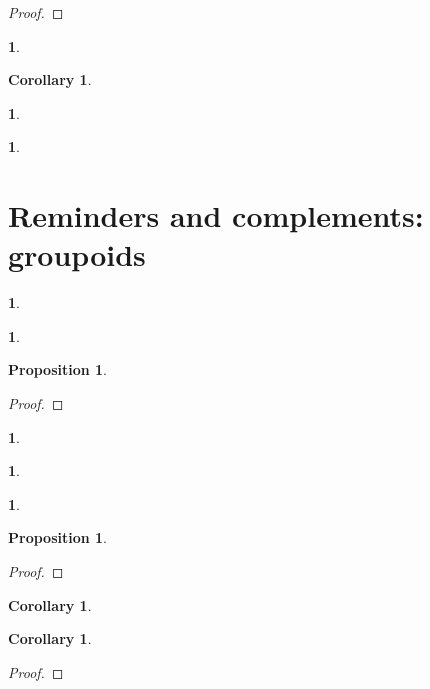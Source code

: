 \documentclass{article}
\newtheorem{env}[term]{}
\newtheorem{proposition}[term]{Proposition}
\newtheorem{cor}[term]{Corollary}
\begin{document}
\begin{proof}
\end{proof}

\begin{env}
\end{env}

\begin{cor}
\end{cor}

\begin{env}
\end{env}

\begin{env}
\end{env}

\section{Reminders and complements: groupoids}

\begin{env}
\end{env}

\begin{env}
\end{env}

\begin{proposition}
\end{proposition}

\begin{proof}
\end{proof}

\begin{env}
\end{env}

\begin{env}
\end{env}

\begin{env}
\end{env}
 
\begin{proposition}
\end{proposition}

\begin{proof}
\end{proof}

\begin{cor}
\end{cor}

\begin{cor}
\end{cor}

\begin{proof}
\end{proof}
\end{document}
